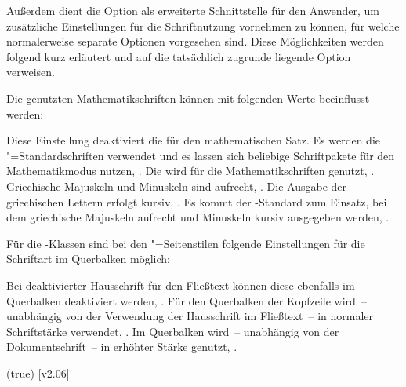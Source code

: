 \begin{DeclareEntity*}{}
\begin{DeclareEntity*}{}
\begin{DeclareEntity*}{}
\begin{Declaration}
Außerdem dient die Option  als erweiterte Schnittstelle 
für den Anwender, um zusätzliche Einstellungen für die Schriftnutzung vornehmen 
zu können, für welche normalerweise separate Optionen vorgesehen sind. Diese 
Möglichkeiten werden folgend kurz erläutert und auf die tatsächlich zugrunde 
liegende Option verweisen.

Die genutzten Mathematikschriften können mit folgenden Werte beeinflusst werden:
%
\begin{DeclareValues}{}
  Diese Einstellung deaktiviert die \OpenSans für den mathematischen Satz. Es 
  werden die "=Standardschriften verwendet und es lassen sich 
  beliebige Schriftpakete für den Mathematikmodus nutzen, 
  .
  Die \OpenSans wird für die Mathematikschriften genutzt, 
  .
  Griechische Majuskeln und Minuskeln sind aufrecht, 
  .
  Die Ausgabe der griechischen Lettern erfolgt kursiv, 
  .
  Es kommt der -Standard zum Einsatz, bei dem griechische 
  Majuskeln aufrecht und Minuskeln kursiv ausgegeben werden, 
  .
\end{DeclareValues}

%
Für die \TUDScript-Klassen sind bei den "=Seitenstilen 
folgende Einstellungen für die Schriftart im Querbalken möglich:
%
\begin{DeclareValues}{}
  Bei deaktivierter Hausschrift für den Fließtext können diese ebenfalls im 
  Querbalken deaktiviert werden, .
  Für den Querbalken der Kopfzeile wird~-- unabhängig von der Verwendung der 
  Hausschrift im Fließtext~-- \OpenSans in normaler Schriftstärke verwendet, 
  .
  Im Querbalken wird~-- unabhängig von der Dokumentschrift~-- \OpenSans in 
  erhöhter Stärke genutzt, .
\end{DeclareValues}
\end{Declaration}

\begin{Declaration}
  {}
  (true)
  [v2.06]
\printdeclarationlist


\end{Declaration}
\end{DeclareEntity*}
\end{DeclareEntity*}
\end{DeclareEntity*}
